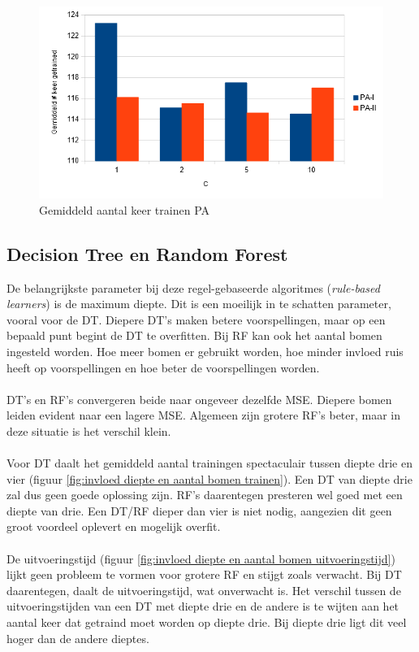 \newpage
\begin{figure}[t]
	\includegraphics[width=\linewidth]{images/evaluatie/aantalkeertrainenpa.png}
	\caption{Gemiddeld aantal keer trainen PA}
	\label{fig:gemiddeld aantal keer trainen pa}
\end{figure}
\subsection{Decision Tree en Random Forest}
De belangrijkste parameter bij deze regel-gebaseerde algoritmes (\textit{rule-based learners}) is de maximum diepte. Dit is een moeilijk in te schatten parameter, vooral voor de DT. Diepere DT’s maken betere voorspellingen, maar op een bepaald punt begint de DT te overfitten. Bij RF kan ook het aantal bomen ingesteld worden. Hoe meer bomen er gebruikt worden, hoe minder invloed ruis heeft op voorspellingen en hoe beter de voorspellingen worden.
\\\\
DT’s en RF’s convergeren beide naar ongeveer dezelfde MSE. Diepere bomen leiden evident naar een lagere MSE. Algemeen zijn grotere RF’s beter, maar in deze situatie is het verschil klein.
\\\\
Voor DT daalt het gemiddeld aantal trainingen spectaculair tussen diepte drie en vier (figuur \ref{fig:invloed diepte en aantal bomen trainen}). Een DT van diepte drie zal dus geen goede oplossing zijn. RF’s daarentegen presteren wel goed met een diepte van drie. Een DT/RF dieper dan vier is niet nodig, aangezien dit geen groot voordeel oplevert en mogelijk overfit.
\\\\
De uitvoeringstijd (figuur \ref{fig:invloed diepte en aantal bomen uitvoeringstijd}) lijkt geen probleem te vormen voor grotere RF en stijgt zoals verwacht. Bij DT daarentegen, daalt de uitvoeringstijd, wat onverwacht is. Het verschil tussen de uitvoeringstijden van een DT met diepte drie en de andere is te wijten aan het aantal keer dat getraind moet worden op diepte drie. Bij diepte drie ligt dit veel hoger dan de andere dieptes.


